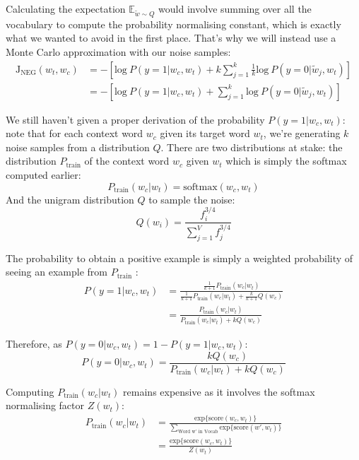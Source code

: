 Calculating the expectation $\mathbb{E}_{\tilde{w}\sim Q}$ would involve summing over all the vocabulary to compute the probability normalising constant, which is exactly what we wanted to avoid in the first place. That's why we will instead use a Monte Carlo approximation with our noise samples:
\begin{align}
    \text{J}_{\text{NEG}}(w_t, w_c)  &= -\left[\text{log}~P(y=1| w_c, w_t) + k\sum_{j=1}^{k}\frac{1}{k}\text{log}~P(y=0|\tilde{w}_j, w_t)\right]\nonumber \\
     &= -\left[\text{log}~P(y=1| w_c, w_t) + \sum_{j=1}^k\text{log}~P(y=0|\tilde{w}_j, w_t)\right]
\end{align}

We still haven't given a proper derivation of the probability $P(y=1| w_c, w_t)$: note that for each context word $w_c$ given its target word $w_t$, we're generating $k$ noise samples from a distribution $Q$. There are two distributions at stake: the distribution $P_{\text{train}}$ of the context word $w_c$ given $w_t$ which is simply the softmax computed earlier:
\begin{equation}
    P_{\text{train}}(w_c|w_t) = \text{softmax}(w_c, w_t)
\end{equation}
And the unigram distribution $Q$ to sample the noise:
\begin{equation}
    Q(w_i) = \frac{f_i^{3/4}}{\sum_{j=1}^V f_j^{3/4}}
\end{equation}

The probability to obtain a positive example is simply a weighted probability of seeing an example from $P_{\text{train}}$ \cite{ruder}:
\begin{align}
    P(y=1| w_c, w_t) &= \frac{\frac{1}{k+1}P_{\text{train}}(w_c|w_t)}{\frac{1}{k+1}P_{\text{train}}(w_c|w_t) + \frac{k}{k+1}Q(w_c)}\nonumber \\
     &= \frac{P_{\text{train}}(w_c|w_t)}{P_{\text{train}}(w_c|w_t) + kQ(w_c)}
\end{align}

Therefore, as $P(y=0| w_c, w_t) = 1 - P(y=1| w_c, w_t)$:
\begin{equation}
    P(y=0| w_c, w_t) = \frac{kQ(w_c)}{P_{\text{train}}(w_c|w_t) + kQ(w_c)}
\end{equation}

Computing $P_{\text{train}}(w_c|w_t)$ remains expensive as it involves the softmax normalising factor $Z(w_t)$:
\begin{align}
    P_{\text{train}}(w_c|w_t) &= \frac{\text{exp}\{\text{score}(w_c, w_t)\}}{\sum_{\text{Word w' in Vocab}}\text{exp}\{\text{score}(w', w_t)\}} \nonumber \\
     &= \frac{\text{exp}\{\text{score}(w_c, w_t)\}}{Z(w_t)}
\end{align}

